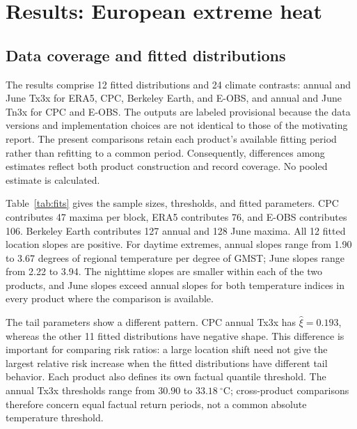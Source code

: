 \documentclass[11pt]{article}
\begin{document}
\section{Results: European extreme heat}
\label{sec:example}
\subsection{Data coverage and fitted distributions}
The results comprise 12 fitted distributions and 24 climate contrasts:
annual and June Tx3x for ERA5, CPC, Berkeley Earth, and E-OBS, and annual
and June Tn3x for CPC and E-OBS. The outputs are labeled provisional because
the data versions and implementation choices are not identical to those
of the motivating report. The present comparisons retain each product's
available fitting period rather than refitting to a common period.
Consequently, differences among estimates reflect both product
construction and record coverage. No pooled estimate is calculated.

Table~\ref{tab:fits} gives the sample sizes, thresholds, and fitted
parameters. CPC contributes 47 maxima per block, ERA5 contributes 76,
and E-OBS contributes 106. Berkeley Earth contributes 127 annual and 128
June maxima. All 12 fitted location slopes are positive. For daytime
extremes, annual slopes range from 1.90 to 3.67 degrees of regional
temperature per degree of GMST; June slopes range from 2.22 to 3.94.
The nighttime slopes are smaller within each of the two products, and
June slopes exceed annual slopes for both temperature indices in every
product where the comparison is available.

The tail parameters show a different pattern. CPC annual Tx3x has
$\widehat\xi=0.193$, whereas the other 11 fitted distributions have
negative shape. This difference is important for comparing risk ratios:
a large location shift need not give the largest relative risk increase
when the fitted distributions have different tail behavior. Each
product also defines its own factual quantile threshold. The annual
Tx3x thresholds range from $30.90$ to $33.18\ ^{\circ}\mathrm{C}$;
cross-product comparisons therefore concern equal factual return periods,
not a common absolute temperature threshold.
\end{document}

